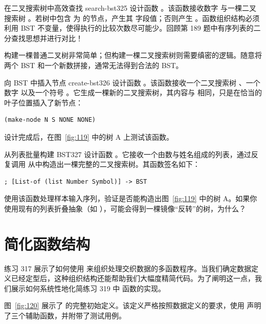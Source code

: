 \begin{exercise}{在二叉搜索树中高效查找 search-bst}{325}
设计函数 。该函数接收数字  与一棵二叉搜索树 。若树中包含  为  的节点，产生其  字段值；否则产生 。函数组织结构必须利用 BST 不变量，使得执行的比较次数尽可能少。回顾第 189 题中有序列表的二分查找思想并进行对比！
\end{exercise}

构建一棵普通二叉树非常简单；但构建一棵二叉搜索树则需要缜密的逻辑。随意将两个 BST 和一个新数拼接，通常无法得到合法的 BST。

\begin{exercise}{向 BST 中插入节点 create-bst}{326}
设计函数 。该函数接收一个二叉搜索树 、一个数字  以及一个符号 。它生成一棵新的二叉搜索树，其内容与  相同，只是在恰当的  叶子位置插入了新节点：
\begin{lstlisting}[language=BSL]
(make-node N S NONE NONE)
\end{lstlisting}
设计完成后，在图~\ref{fig:119} 中的树 A 上测试该函数。
\end{exercise}

\begin{exercise}{从列表批量构建 BST}{327}
设计函数 。它接收一个由数与姓名组成的列表，通过反复调用  从中构造出一棵完整的二叉搜索树。其函数签名如下：
\begin{lstlisting}[language=BSL]
; [List-of (list Number Symbol)] -> BST
\end{lstlisting}
使用该函数处理样本输入序列，验证是否能构造出图~\ref{fig:119} 中的树 A。如果你使用现有的列表折叠抽象（如 ），可能会得到一棵镜像“反转”的树，为什么？
\end{exercise}

\section{简化函数结构}
\label{sec:19.6_simplifying}

练习 317 展示了如何使用  来组织处理交织数据的多函数程序。当我们确定数据定义已经定型后，这种组织结构还能帮助我们大幅度精简代码。为了阐明这一点，我们展示如何系统性地化简练习 319 中  函数的实现。

图~\ref{fig:120} 展示了  的完整初始定义。该定义严格按照数据定义的要求，使用  声明了三个辅助函数，并附带了测试用例。


